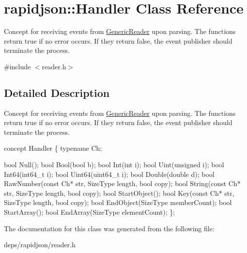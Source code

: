 \hypertarget{classrapidjson_1_1_handler}{}\section{rapidjson\+:\+:Handler Class Reference}
\label{classrapidjson_1_1_handler}


Concept for receiving events from \hyperlink{class_generic_reader}{Generic\+Reader} upon parsing. The functions return true if no error occurs. If they return false, the event publisher should terminate the process.  




{\ttfamily \#include $<$reader.\+h$>$}



\subsection{Detailed Description}
Concept for receiving events from \hyperlink{class_generic_reader}{Generic\+Reader} upon parsing. The functions return true if no error occurs. If they return false, the event publisher should terminate the process. 


\begin{DoxyCode}
concept Handler \{
    \textcolor{keyword}{typename} Ch;

    \textcolor{keywordtype}{bool} Null();
    \textcolor{keywordtype}{bool} Bool(\textcolor{keywordtype}{bool} b);
    \textcolor{keywordtype}{bool} Int(\textcolor{keywordtype}{int} i);
    \textcolor{keywordtype}{bool} Uint(\textcolor{keywordtype}{unsigned} i);
    \textcolor{keywordtype}{bool} Int64(int64\_t i);
    \textcolor{keywordtype}{bool} Uint64(uint64\_t i);
    \textcolor{keywordtype}{bool} Double(\textcolor{keywordtype}{double} d);
    \textcolor{keywordtype}{bool} RawNumber(\textcolor{keyword}{const} Ch* str, SizeType length, \textcolor{keywordtype}{bool} copy);
    \textcolor{keywordtype}{bool} String(\textcolor{keyword}{const} Ch* str, SizeType length, \textcolor{keywordtype}{bool} copy);
    \textcolor{keywordtype}{bool} StartObject();
    \textcolor{keywordtype}{bool} Key(\textcolor{keyword}{const} Ch* str, SizeType length, \textcolor{keywordtype}{bool} copy);
    \textcolor{keywordtype}{bool} EndObject(SizeType memberCount);
    \textcolor{keywordtype}{bool} StartArray();
    \textcolor{keywordtype}{bool} EndArray(SizeType elementCount);
\};
\end{DoxyCode}
 

The documentation for this class was generated from the following file\+:\begin{DoxyCompactItemize}
\item 
deps/rapidjson/reader.\+h\end{DoxyCompactItemize}
